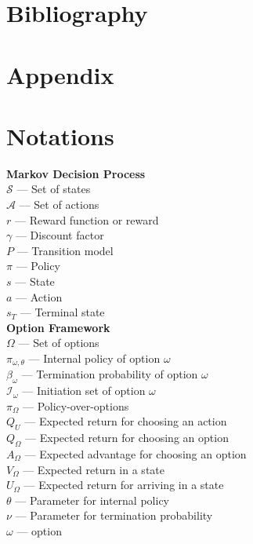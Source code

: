 \documentclass{article}
\begin{document}
	\section{Bibliography}
	
	
		
	\section{Appendix}
	\appendix
	\section{Notations}
	{\bfseries Markov Decision Process}\\
	$\mathcal{S}$ --- Set of states\\
	$\mathcal{A}$ --- Set of actions\\
	$r$ --- Reward function or reward\\
	$\gamma$ --- Discount factor\\
	$P$ --- Transition model\\
	$\pi$ --- Policy\\
	$s$ --- State\\
	$a$ --- Action\\
	$s_T$ --- Terminal state\vspace{0.1in}\\
	{\bfseries Option Framework}\\
	$\Omega$ --- Set of options\\
	$\pi_{\omega,\theta}$ --- Internal policy of option $\omega$\\
	$\beta_\omega$ --- Termination probability of option $\omega$\\
	$\mathcal{I}_\omega$ --- Initiation set of option $\omega$\\
	$\pi_\Omega$ --- Policy-over-options\\
	$Q_U$ --- Expected return for choosing an action\\
	$Q_\Omega$ --- Expected return for choosing an option\\
	$A_\Omega$ --- Expected advantage for choosing an option\\
	$V_\Omega$ --- Expected return in a state\\
	$U_\Omega$ --- Expected return for arriving in a state\\
	$\theta$ --- Parameter for internal policy\\
	$\nu$ --- Parameter for termination probability\\
	$\omega$ --- option\vspace{0.1in}\\
\end{document}
